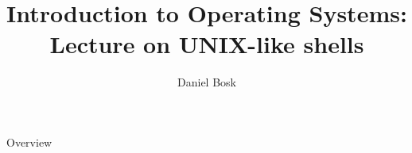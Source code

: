 \documentclass[handout]{beamer}
\title[UNIX-like shells]{%
	Introduction to Operating Systems:\\
	Lecture on UNIX-like shells
}
\author{Daniel Bosk}
\institute{%
	Department of Information Technology and Media (ITM),\\
	Mid Sweden University, Sundsvall.
}
\date{\svnId}
\begin{document}
\begin{frame}
  \titlepage
\end{frame}

\begin{frame}{Overview}
	\tableofcontents
\end{frame}



\end{document}
